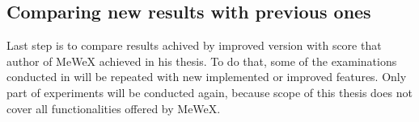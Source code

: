 \subsection{Comparing new results with previous ones}
Last step is to compare results achived by improved version with score that author of MeWeX achieved in his thesis.
To do that, some of the examinations conducted in \cite{mgr} will be repeated with new implemented or improved features. 
Only part of experiments will be conducted again, because scope of this thesis does not cover all functionalities offered by MeWeX.